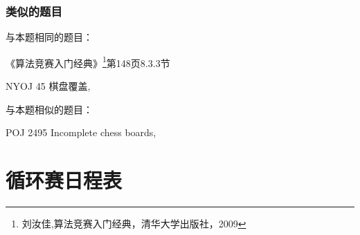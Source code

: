 \subsubsection{类似的题目}
与本题相同的题目：
\begindot
\item 《算法竞赛入门经典》\footnote{刘汝佳,算法竞赛入门经典，清华大学出版社，2009}第148页8.3.3节
\item NYOJ 45 棋盘覆盖, 
\myenddot

与本题相似的题目：
\begindot
\item POJ 2495 Incomplete chess boards, 
\myenddot


\section{循环赛日程表} %


